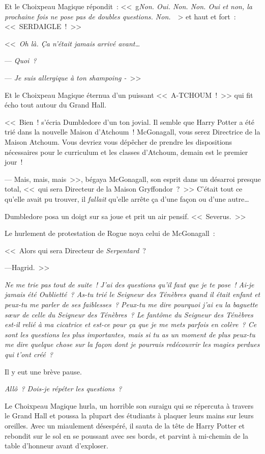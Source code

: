 {Et le Choixpeau Magique répondit~: <<~g\emph{Non. Oui. Non. Non. Oui et non, la prochaine fois ne pose pas de doubles questions. Non.}~~> et haut et fort~: <<~SERDAIGLE~!~>>

\later

<<~\emph{Oh là. Ça n'était jamais arrivé avant…}

--- \emph{Quoi~?}

--- \emph{Je suis allergique à ton shampoing -}~>>

Et le Choixpeau Magique éternua d'un puissant <<~A-TCHOUM~!~>> qui fit écho tout autour du Grand Hall.

<<~Bien~! s'écria Dumbledore d'un ton jovial. Il semble que Harry Potter a été trié dans la nouvelle Maison d'Atchoum~! McGonagall, vous serez Directrice de la Maison Atchoum. Vous devriez vous dépêcher de prendre les dispositions nécessaires pour le curriculum et les classes d'Atchoum, demain est le premier jour~!

--- Mais, mais, mais~>>, bégaya McGonagall, son esprit dans un désarroi presque total, <<~qui sera Directeur de la Maison Gryffondor~?~>> C'était tout ce qu'elle avait pu trouver, il \emph{fallait} qu'elle arrête ça d'une façon ou d'une autre…

Dumbledore posa un doigt sur sa joue et prit un air pensif. <<~Severus.~>>

Le hurlement de protestation de Rogue noya celui de McGonagall~:

<<~Alors qui sera Directeur de \emph{Serpentard}~?

---Hagrid.~>>

\later

\emph{Ne me trie pas tout de suite~! J'ai des questions qu'il faut que je te pose~! Ai-je jamais été Oublietté~? As-tu trié le Seigneur des Ténèbres quand il était enfant et peux-tu me parler de ses faiblesses~? Peux-tu me dire pourquoi j'ai eu la baguette sœur de celle du Seigneur des Ténèbres~? Le fantôme du Seigneur des Ténèbres est-il relié à ma cicatrice et est-ce pour ça que je me mets parfois en colère~? Ce sont les questions les plus importantes, mais si tu as un moment de plus peux-tu me dire quelque chose sur la façon dont je pourrais redécouvrir les magies perdues qui t'ont créé~?}

Il y eut une brève pause.

\emph{Allô~? Dois-je répéter les questions~?}

Le Choixpeau Magique hurla, un horrible son suraigu qui se répercuta à travers le Grand Hall et poussa la plupart des étudiants à plaquer leurs mains sur leurs oreilles. Avec un miaulement désespéré, il sauta de la tête de Harry Potter et rebondit sur le sol en se poussant avec ses bords, et parvint à mi-chemin de la table d'honneur avant d'exploser.

}
